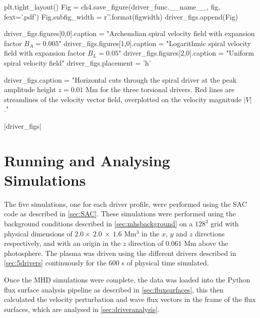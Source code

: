 \begin{pycode}[chapter4]
    plt.tight_layout()
    Fig = ch4.save_figure(driver_func.__name__, fig, fext='.pdf')
    Fig.subfig_width = r'{}\columnwidth'.format(figwidth)
    driver_figs.append(Fig)

driver_figs.figures[0,0].caption = "Archemdian spiral velocity field with expansion factor $B_A=0.005$"
driver_figs.figures[1,0].caption = "Logarithmic spiral velocity field with expansion factor $B_L=0.05$"
driver_figs.figures[2,0].caption = "Uniform spiral velocity field"
driver_figs.placement = 'h'

driver_figs.caption = "Horizontal cuts through the spiral driver at the peak amplitude height $z = 0.01$ Mm for the three torsional drivers. Red lines are streamlines of the velocity vector field, overplotted on the velocity magnitude $|V|$."
\end{pycode}

\py[chapter4]|driver_figs|

\section{Running and Analysing Simulations}

The five simulations, one for each driver profile, were performed using the SAC code as described in \cref{sec:SAC}.
These simulations were performed using the background conditions described in \cref{sec:mhsbackground} on a $128^3$ grid with physical dimensions of $2.0 \times\ 2.0\ \times\ 1.6$ Mm$^3$ in the $x$, $y$ and $z$ directions respectively, and with an origin in the $z$ direction of $0.061$ Mm above the photosphere.
The plasma was driven using the different drivers described in \cref{sec:5drivers} continuously for the $600$ s of physical time simulated.

Once the MHD simulations were complete, the data was loaded into the Python flux surface analysis pipeline as described in \cref{sec:fluxsurfaces}, this then calculated the velocity perturbation and wave flux vectors in the frame of the flux surfaces, which are analysed in \cref{sec:driveranalysis}.

